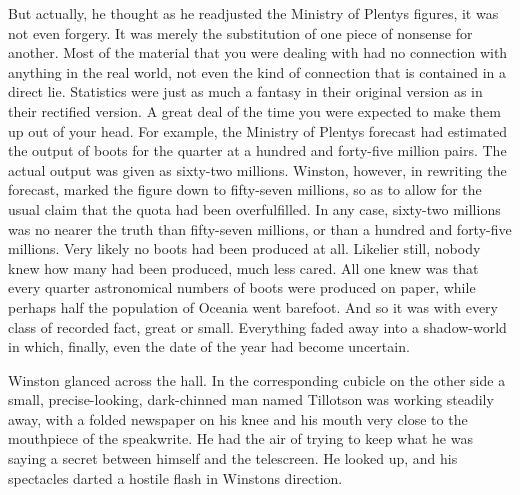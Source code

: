 But actually, he thought as he readjusted the Ministry of
Plenty\textquotesingle s figures, it was not even forgery. It was merely
the substitution of one piece of nonsense for another. Most of the
material that you were dealing with had no connection with anything in
the real world, not even the kind of connection that is contained in a
direct lie. Statistics were just as much a fantasy in their original
version as in their rectified version. A great deal of the time you were
expected to make them up out of your head. For example, the Ministry of
Plenty\textquotesingle s forecast had estimated the output of boots for
the quarter at a hundred and forty-five million pairs. The actual output
was given as sixty-two millions. Winston, however, in rewriting the
forecast, marked the figure down to fifty-seven millions, so as to allow
for the usual claim that the quota had been overfulfilled. In any case,
sixty-two millions was no nearer the truth than fifty-seven millions, or
than a hundred and forty-five millions. Very likely no boots had been
produced at all. Likelier still, nobody knew how many had been produced,
much less cared. All one knew was that every quarter astronomical
numbers of boots were produced on paper, while perhaps half the
population of Oceania went barefoot. And so it was with every class of
recorded fact, great or small. Everything faded away into a shadow-world
in which, finally, even the date of the year had become uncertain.

Winston glanced across the hall. In the corresponding cubicle on the
other side a small, precise-looking, dark-chinned man named Tillotson
was working steadily away, with a folded newspaper on his knee and his
mouth very close to the mouthpiece of the speakwrite. He had the air of
trying to keep what he was saying a secret between himself and the
telescreen. He looked up, and his spectacles darted a hostile flash in
Winston\textquotesingle s direction.

